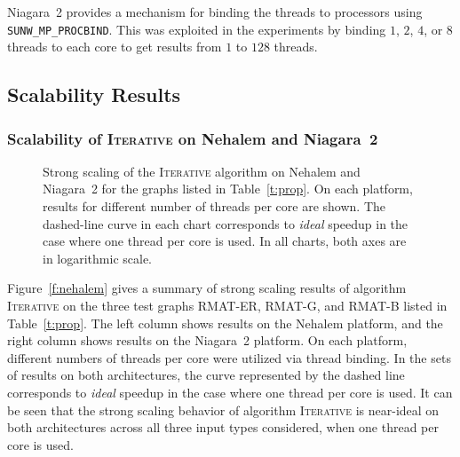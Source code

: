 \documentclass{article}
\begin{document}
Niagara~2 provides a mechanism for binding the threads to processors using
\texttt{SUNW\_MP\_PROCBIND}. This was exploited in the experiments by
binding $1$, $2$, $4$, or $8$ threads to each core to get results from $1$ to $128$ threads. 

\subsection{Scalability Results}
\label{sec:scalability-sep}

\subsubsection{Scalability of \textsc{Iterative} on Nehalem and Niagara~2}


\begin{figure}
\centering
{}
\caption{\small Strong scaling of the \textsc{Iterative} algorithm on Nehalem and Niagara~2
for the graphs listed in Table~\ref{t:prop}.
On each platform, results for different number of threads per core are shown. 
The dashed-line curve in each chart corresponds to {\em ideal} speedup in the case where 
one thread per core is used. In all charts, both axes are in logarithmic scale.}
\label{f:nehalem}
\label{f:niagara}
\end{figure}

Figure~\ref{f:nehalem} gives a summary of strong scaling results of algorithm \textsc{Iterative} 
on the three test graphs RMAT-ER, RMAT-G, and RMAT-B listed in Table~\ref{t:prop}.
The left column shows results on the Nehalem platform, 
and the right column shows results on the Niagara~2 platform. 
On each platform, different numbers of threads per core were utilized via thread binding.
In the sets of results on both architectures, the curve
represented by the dashed line corresponds to {\em ideal} speedup
in the case where one thread per core is used.
It can be seen that the strong scaling behavior of algorithm \textsc{Iterative} is near-ideal
on both architectures across all three input types considered, when one thread per core is used.
\end{document}
